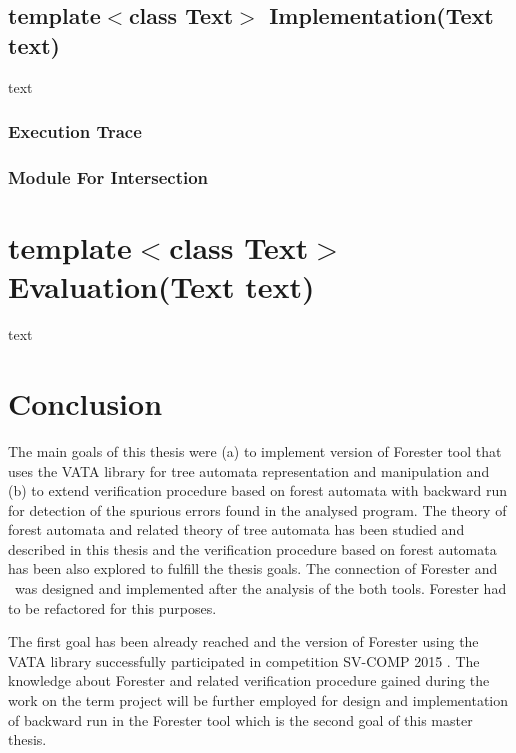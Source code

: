 \section{template$<$class Text$>$ Implementation(Text text)}
\label{sec:impl}
text

\subsection{Execution Trace}
\subsection{Module For Intersection}

\chapter{template$<$class Text$>$ Evaluation(Text text)}
\label{ch:eval}
text

\chapter{Conclusion}
\label{ch:concl}

The main goals of this thesis were (a) to implement version of Forester tool that uses the VATA library for tree automata representation and manipulation
and (b) to extend verification procedure based on forest automata with backward run for detection of the spurious errors found in the analysed program.
The theory of forest automata and related theory of tree automata has been studied and described in this thesis and the verification procedure
based on forest automata has been also explored to fulfill the thesis goals.
The connection of Forester and \vata\ was designed and implemented after the analysis of the both tools.
Forester had to be refactored for this purposes.

The first goal has been already reached and the version of Forester using the VATA library successfully participated in competition SV-COMP 2015 \cite{www:svcomp}.
The knowledge about Forester and related verification procedure gained during the work on the term project will be further employed for design
and implementation of backward run in the Forester tool which is the second goal of this master thesis.

